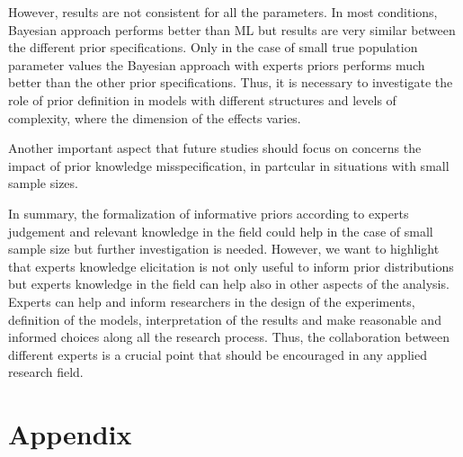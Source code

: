 \documentclass[graybox]{svmult}
\begin{document}
However, results are not consistent for all the parameters. In most conditions, Bayesian approach performs better than ML but results are very similar between the different prior specifications. Only in the case of small true population parameter values the Bayesian approach with experts priors performs much better than the other prior specifications. Thus, it is necessary to investigate the role of prior definition in models with different structures and levels of complexity, where the dimension of the effects varies.

Another important aspect that future studies should focus on concerns the impact of prior knowledge misspecification, in partcular in situations with small sample sizes.


In summary, the formalization of informative priors according to experts judgement and relevant knowledge in the field could help in the case of small sample size but further investigation is needed. However, we want to highlight that experts knowledge elicitation is not only useful to inform prior distributions but experts knowledge in the field can help also in other aspects of the analysis. Experts can help and inform researchers in the design of the experiments, definition of the models, interpretation of the results and make reasonable and informed choices along all the research process. Thus, the collaboration between different experts is a crucial point that should be encouraged in any applied research field.

\clearpage

\section*{Appendix}
\label{sec: apendix}
\end{document}
